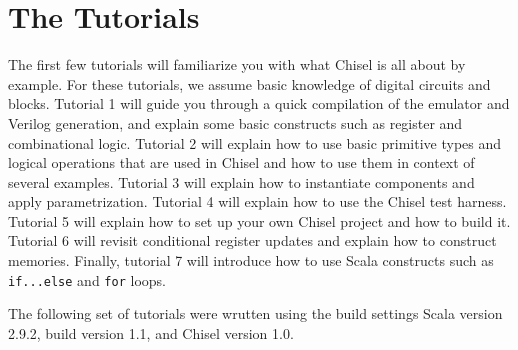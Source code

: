 \documentclass[twocolumn, 10pt]{article}
\begin{document}
\section{The Tutorials}

The first few tutorials will familiarize you with what Chisel is all about by example. For these tutorials, we assume basic knowledge of digital circuits and blocks. 
Tutorial 1 will guide you through a quick compilation of the emulator and Verilog generation, and explain some basic constructs such as register and combinational logic. 
Tutorial 2 will explain how to use basic primitive types and logical operations that are used in Chisel and how to use them in context of several examples. 
Tutorial 3 will explain how to instantiate components and apply parametrization. 
Tutorial 4 will explain how to use the Chisel test harness. 
Tutorial 5 will explain how to set up your own Chisel project and how to build it.
Tutorial 6 will revisit conditional register updates and explain how to construct memories.
Finally, tutorial 7 will introduce how to use Scala constructs such as \verb+if...else+ and \verb+for+ loops.

The following set of tutorials were wrutten using the build settings Scala version 2.9.2, build version 1.1, and Chisel version 1.0.
\end{document}

